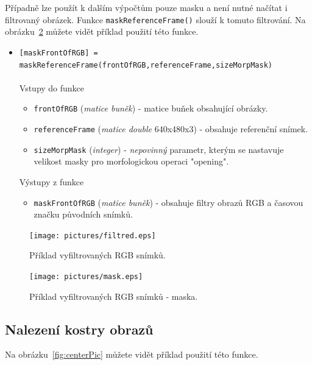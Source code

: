 \documentclass[10pt,a4paper,titlepage,oneside]{report}
\begin{document}
\noindent Případně lze použít k dalším výpočtům pouze masku a není nutné načítat i filtrovaný obrázek. Funkce \verb|maskReferenceFrame()| slouží k tomuto filtrování. Na obrázku~\ref{fig:maskPic} můžete vidět příklad použití této funkce.
\begin{itemize}
  	\item \verb|[maskFrontOfRGB] =|\\ \verb|maskReferenceFrame(frontOfRGB,referenceFrame,sizeMorpMask)|\\
\\
    		Vstupy do funkce
        		\begin{itemize}
  			\item \verb|frontOfRGB| (\textit{matice buněk}) - matice buňek obsahující obrázky.
  			\item \verb|referenceFrame| (\textit{matice double} 640x480x3) - obsahuje referenční snímek.
  			\item \verb|sizeMorpMask| (\textit{integer}) - \textit{nepovinný} parametr, kterým se nastavuje velikost masky pro morfologickou  operaci "opening"\cite{hlavacOpen}.
    			\end{itemize}
    		Výstupy z funkce
        		\begin{itemize}
  			\item \verb|maskFrontOfRGB| (\textit{matice buněk}) - obsahuje filtry obrazů RGB a časovou značku původních snímků.
    			\end{itemize}
    \end{itemize}

\begin{figure}[H]
	\centering  	
  	\texttt{[image: pictures/filtred.eps]}
  	\caption[]{Příklad vyfiltrovaných RGB snímků.	  	
  	}
  	\label{fig:filtredPic}
\end{figure}

\begin{figure}[H]
	\centering  	
  	\texttt{[image: pictures/mask.eps]}
  	\caption[]{Příklad vyfiltrovaných RGB snímků - maska.	  	
  	}
  	\label{fig:maskPic}
\end{figure}





\subsection{Nalezení kostry obrazů}

Na obrázku~\ref{fig:centerPic} můžete vidět příklad použití této funkce.
\end{document}
